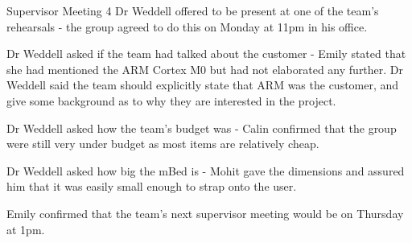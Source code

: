 \documentclass{article}
\begin{document}
\begin{Minutes}{Supervisor Meeting 4}
Dr Weddell offered to be present at one of the team's rehearsals - the group agreed to do this on Monday at 11pm in his office.

Dr Weddell asked if the team had talked about the customer - Emily stated that she had mentioned the ARM Cortex M0 but had not elaborated any further.
Dr Weddell said the team should explicitly state that ARM was the customer, and give some background as to why they are interested in the project.


Dr Weddell asked how the team's budget was - Calin confirmed that the group were still very under budget as most items are relatively cheap.

Dr Weddell asked how big the mBed is - Mohit gave the dimensions and assured him that it was easily small enough to strap onto the user.

Emily confirmed that the team's next supervisor meeting would be on Thursday at 1pm.

\end{Minutes}
\end{document}
